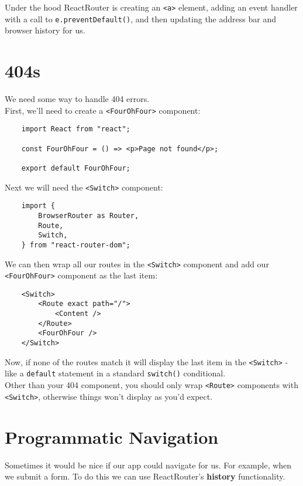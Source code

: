 Under the hood ReactRouter is creating an \texttt{<a>} element, adding an event handler with a call to \texttt{e.preventDefault()}, and then updating the address bar and browser history for us.



\section{404s}


We need some way to handle 404 errors.
\\

First, we'll need to create a \texttt{<FourOhFour>} component:

\begin{verbatim}
    import React from "react";

    const FourOhFour = () => <p>Page not found</p>;

    export default FourOhFour;
\end{verbatim}


Next we will need the \texttt{<Switch>} component:

\begin{verbatim}
    import {
        BrowserRouter as Router,
        Route,
        Switch,
    } from "react-router-dom";
\end{verbatim}

We can then wrap all our routes in the \texttt{<Switch>} component and add our \texttt{<FourOhFour>} component as the last item:

\begin{verbatim}
    <Switch>
        <Route exact path="/">
            <Content />
        </Route>
        <FourOhFour />
    </Switch>
\end{verbatim}

Now, if none of the routes match it will display the last item in the \texttt{<Switch>} - like a \texttt{default} statement in a standard \texttt{switch()} conditional.
\\

Other than your 404 component, you should only wrap \texttt{<Route>} components with \texttt{<Switch>}, otherwise things won't display as you'd expect.


\section{Programmatic Navigation}

Sometimes it would be nice if our app could navigate for us. For example, when we submit a form. To do this we can use ReactRouter's \textbf{history} functionality.
\\

